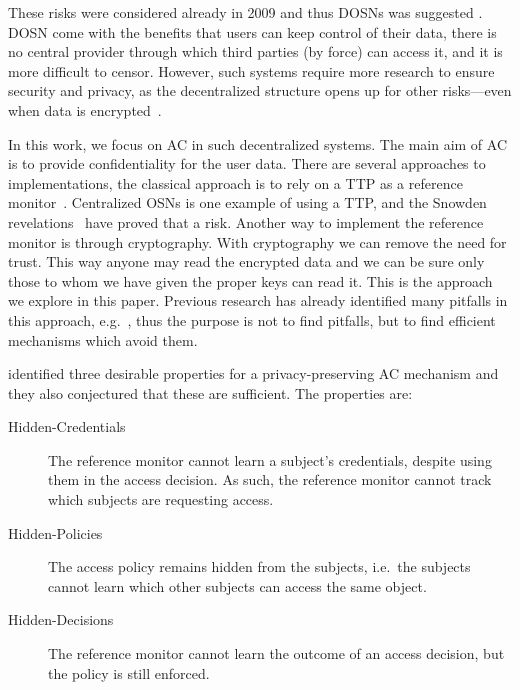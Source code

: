 These risks were considered already in 2009 and thus \acp{DOSN} was suggested 
\cite[e.g.][]{peerson}.
\ac{DOSN} come with the benefits that users can keep control of their data, 
there is no central provider through which third parties (by force) can access 
it, and it is more difficult to censor.
However, such systems require more research to ensure security and privacy, as 
the decentralized structure opens up for other risks---even when data is 
encrypted~\cite{metadata}.

In this work, we focus on \ac{AC} in such decentralized systems.
The main aim of \ac{AC} is to provide confidentiality for the user data.
There are several approaches to implementations, the classical approach is to 
rely on a \ac{TTP} as a reference monitor~\cite{AccessControl}.
Centralized \acp{OSN} is one example of using a \ac{TTP}, and the Snowden 
revelations~\cite{prism} have proved that a risk.
Another way to implement the reference monitor is through cryptography.
With cryptography we can remove the need for trust.
This way anyone may read the encrypted data and we can be sure only those to 
whom we have given the proper keys can read it.
This is the approach we explore in this paper.
Previous research has already identified many pitfalls in this approach, 
e.g.~\cite{metadata}, thus the purpose is not to find pitfalls, but to find 
efficient mechanisms which avoid them.

\citet{TowardsPPACwHPHCHD} identified three desirable properties for 
a privacy-preserving \ac{AC} mechanism and they also conjectured that these are 
sufficient.
The properties are:
\begin{description}
  \item[Hidden-Credentials] The reference monitor cannot learn a subject's 
    credentials, despite using them in the access decision.
    As such, the reference monitor cannot track which subjects are requesting 
    access.
  \item[Hidden-Policies] The access policy remains hidden from the subjects, 
    i.e.\ the subjects cannot learn which other subjects can access the same 
    object.
  \item[Hidden-Decisions] The reference monitor cannot learn the outcome of an 
    access decision, but the policy is still enforced.
\end{description}

